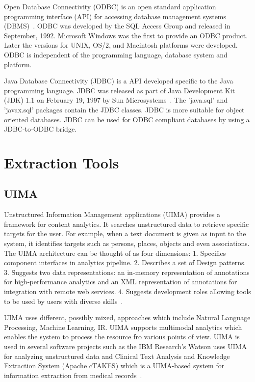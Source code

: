 Open Database Connectivity (ODBC) is an open standard application
programming interface (API) for accessing database management systems
(DBMS)~\cite{www-odbc}. ODBC was developed by the SQL Access Group and
released in September, 1992. Microsoft Windows was the first to
provide an ODBC product. Later the versions for UNIX, OS/2, and
Macintosh platforms were developed. ODBC is independent of the
programming language, database system and platform.

Java Database Connectivity (JDBC) is a API developed specific to the
Java programming language. JDBC was released as part of Java
Development Kit (JDK) 1.1 on February 19, 1997 by Sun
Microsystems~\cite{www-jdbc}. The 'java.sql' and 'javax.sql' packages
contain the JDBC classes. JDBC is more suitable for object oriented
databases. JDBC can be used for ODBC compliant databases by using a
JDBC-to-ODBC bridge.

\section{Extraction Tools}
\label{S:o-Tools}


\subsection{UIMA }

Unstructured Information Management applications (UIMA) provides a
framework for content analytics. It searches unstructured data to
retrieve specific targets for the user. For example, when a text
document is given as input to the system, it identifies targets such
as persons, places, objects and even associations. The UIMA
architecture can be thought of as four dimensions: 1. Specifies
component interfaces in analytics pipeline.  2. Describes a set of
Design patterns. 3. Suggests two data representations: an in-memory
representation of annotations for high-performance analytics and an
XML representation of annotations for integration with remote web
services. 4. Suggests development roles allowing tools to be used by
users with diverse skills~\cite{www-wiki-uima}.

UIMA uses different, possibly mixed, approaches which include Natural
Language Processing, Machine Learning, IR. UIMA supports multimodal
analytics which enables the system to process the resource fro various
points of view. UIMA is used in several software projects such as the
IBM Research's Watson uses UIMA for analyzing unstructured data and
Clinical Text Analysis and Knowledge Extraction System (Apache cTAKES)
which is a UIMA-based system for information extraction from medical
records~\cite{www-uima-slideshare}.

